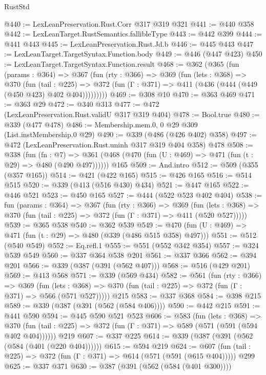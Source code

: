 \begin{lexlean}{RustStd}
\begin{coremodule}
@440 := LexLeanPreservation.Rust.Corr @317 @319 @321
@441 := @440 @358
@442 := LexLeanTarget.RustSemantics.fallibleType
@443 := @442 @399
@444 := @441 @443
@445 := LexLeanPreservation.Rust.Jd.b
@446 := @445 @443
@447 := LexLeanTarget.TargetSyntax.Function.body
@449 := @446 (@447 @423)
@450 := LexLeanTarget.TargetSyntax.Function.result
@468 := @362
    (@365
      (fun (params : @364) =>
      @367
        (fun (rty : @366) =>
        @369
          (fun (lets : @368) =>
          @370
            (fun (tail : @225) =>
            @372 (fun (Γ : @371) => @411 (@436 (@444 (@449 (@450 @423) @402 @404)))))))))
@469 := @308 @10
@470 := @363 @469
@471 := @363 @29
@472 := @340 @313
@477 := @472 (LexLeanPreservation.Rust.validU @317 @319 @404)
@478 := Bool.true
@480 := @339 (@477 @478)
@486 := Membership.mem.{0, 0} @29 @309 (List.instMembership.{0} @29)
@490 := @339 (@486 (@426 @402) @358)
@497 := @472 (LexLeanPreservation.Rust.uninh @317 @319 @404 @358) @478
@508 := @338
    (fun (fn : @7) =>
    @361 (@468 (@470 (fun (U : @469) => @471 (fun (t : @29) => @480 (@490 @497))))))
    @165
@509 := And.intro
@512 := @509 (@355 (@357 @165))
@514 := @421 (@422 @165)
@515 := @426 @165
@516 := @514 @515
@520 := @339 (@413 (@516 @430) @434)
@521 := @447 @165
@522 := @446 @521
@523 := @450 @165
@527 := @444 (@522 @523 @402 @404)
@538 := fun (params : @364) =>
  @367
    (fun (rty : @366) =>
    @369
      (fun (lets : @368) => @370 (fun (tail : @225) => @372 (fun (Γ : @371) => @411 (@520 @527)))))
@539 := @365 @538
@540 := @362 @539
@549 := @470 (fun (U : @469) => @471 (fun (t : @29) => @480 (@339 (@486 @515 @358) @497)))
@551 := @512 (@540 @549)
@552 := Eq.refl.{1}
@555 := @551 (@552 @342 @354)
@557 := @324 @539 @549
@560 := @337 @364 @538 @201
@561 := @337 @366
@562 := @394 @201
@566 := @339 (@387 (@391 (@562 @407)))
@568 := @516 (@429 @201)
@569 := @413 @568
@571 := @339 (@569 @434)
@582 := @561
    (fun (rty : @366) =>
    @369
      (fun (lets : @368) => @370 (fun (tail : @225) => @372 (fun (Γ : @371) => @566 (@571 @527)))))
    @215
@583 := @337 @368
@584 := @398 @215
@589 := @339 (@387 (@391 (@562 (@584 @406))))
@590 := @442 @215
@591 := @441 @590
@594 := @445 @590 @521 @523
@606 := @583
    (fun (lets : @368) =>
    @370 (fun (tail : @225) => @372 (fun (Γ : @371) => @589 (@571 (@591 (@594 @402 @404))))))
    @219
@607 := @337 @225
@614 := @339 (@387 (@391 (@562 (@584 (@401 (@220 @404))))))
@615 := @594 @219
@624 := @607 (fun (tail : @225) => @372 (fun (Γ : @371) => @614 (@571 (@591 (@615 @404))))) @299
@625 := @337 @371
@630 := @387 (@391 (@562 (@584 (@401 @300))))

\end{coremodule}
\end{lexlean}
